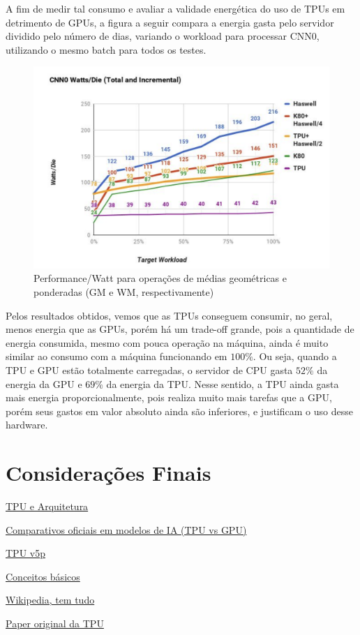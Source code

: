 \documentclass{report}
\begin{document}
A fim de medir tal consumo e avaliar a validade energética do uso de TPUs em detrimento de GPUs, a figura a seguir compara a energia gasta pelo servidor dividido pelo número de dias, variando o workload para processar CNN0, utilizando o mesmo batch para todos os testes.

\begin{figure}[h]
	\includegraphics[scale=0.5]{watts-die}
	\centering
	\caption{Performance/Watt para operações de médias geométricas e ponderadas (GM e WM, respectivamente)}
\end{figure}


Pelos resultados obtidos, vemos que as TPUs conseguem consumir, no geral, menos energia que as GPUs, porém há um trade-off grande, pois a quantidade de energia consumida, mesmo com pouca operação na máquina, ainda é muito similar ao consumo com a máquina funcionando em $100\%$. Ou seja, quando a TPU e GPU estão totalmente carregadas, o servidor de CPU gasta $52\%$ da energia da GPU e $69\%$ da energia da TPU. Nesse sentido, a TPU ainda gasta mais energia proporcionalmente, pois realiza muito mais tarefas que a GPU, porém seus gastos em valor absoluto ainda são inferiores, e justificam o uso desse hardware.

\chapter{Considerações Finais}




\href{https://www.run.ai/guides/cloud-deep-learning/google-tpu}{TPU e Arquitetura}

\href{https://cloud.google.com/blog/products/compute/performance-per-dollar-of-gpus-and-tpus-for-ai-inference}{Comparativos oficiais em modelos de IA (TPU vs GPU)}

\href{https://canaltech.com.br/inteligencia-artificial/cloud-tpu-v5p-e-o-novo-e-mais-poderoso-acelerador-de-ia-do-google-272299/}{TPU v5p}

\href{https://cloud.google.com/tpu?hl=pt-BR}{Conceitos básicos}

\href{https://en.wikipedia.org/wiki/Tensor_Processing_Unit}{Wikipedia, tem tudo}

\href{https://arxiv.org/pdf/1704.04760}{Paper original da TPU}
\end{document}
